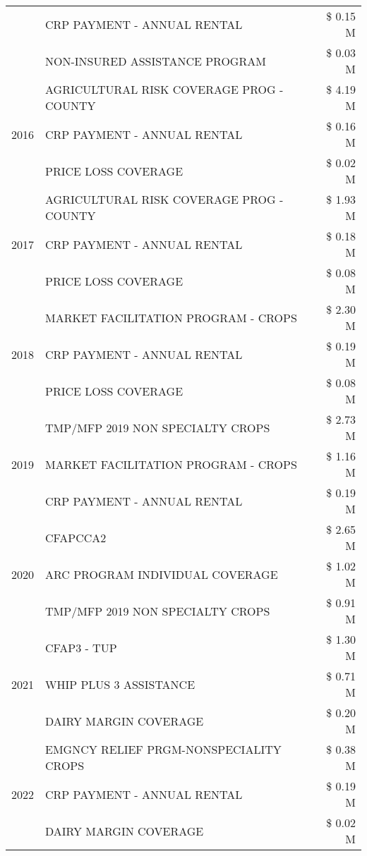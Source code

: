 \begin{tabular}{llr}
 & CRP PAYMENT - ANNUAL RENTAL & \$ 0.15 M \\
 & NON-INSURED ASSISTANCE PROGRAM & \$ 0.03 M \\
\cline{1-3}
\multirow[t]{3}{*}{2016} & AGRICULTURAL RISK COVERAGE PROG - COUNTY & \$ 4.19 M \\
 & CRP PAYMENT - ANNUAL RENTAL & \$ 0.16 M \\
 & PRICE LOSS COVERAGE & \$ 0.02 M \\
\cline{1-3}
\multirow[t]{3}{*}{2017} & AGRICULTURAL RISK COVERAGE PROG - COUNTY & \$ 1.93 M \\
 & CRP PAYMENT - ANNUAL RENTAL & \$ 0.18 M \\
 & PRICE LOSS COVERAGE & \$ 0.08 M \\
\cline{1-3}
\multirow[t]{3}{*}{2018} & MARKET FACILITATION PROGRAM - CROPS & \$ 2.30 M \\
 & CRP PAYMENT - ANNUAL RENTAL & \$ 0.19 M \\
 & PRICE LOSS COVERAGE & \$ 0.08 M \\
\cline{1-3}
\multirow[t]{3}{*}{2019} & TMP/MFP 2019 NON SPECIALTY CROPS & \$ 2.73 M \\
 & MARKET FACILITATION PROGRAM - CROPS & \$ 1.16 M \\
 & CRP PAYMENT - ANNUAL RENTAL & \$ 0.19 M \\
\cline{1-3}
\multirow[t]{3}{*}{2020} & CFAPCCA2 & \$ 2.65 M \\
 & ARC PROGRAM INDIVIDUAL COVERAGE & \$ 1.02 M \\
 & TMP/MFP 2019 NON SPECIALTY CROPS & \$ 0.91 M \\
\cline{1-3}
\multirow[t]{3}{*}{2021} & CFAP3 - TUP & \$ 1.30 M \\
 & WHIP PLUS 3 ASSISTANCE & \$ 0.71 M \\
 & DAIRY MARGIN COVERAGE & \$ 0.20 M \\
\cline{1-3}
\multirow[t]{3}{*}{2022} & EMGNCY RELIEF PRGM-NONSPECIALITY CROPS & \$ 0.38 M \\
 & CRP PAYMENT - ANNUAL RENTAL & \$ 0.19 M \\
 & DAIRY MARGIN COVERAGE & \$ 0.02 M \\
\cline{1-3}
\bottomrule
\end{tabular}
